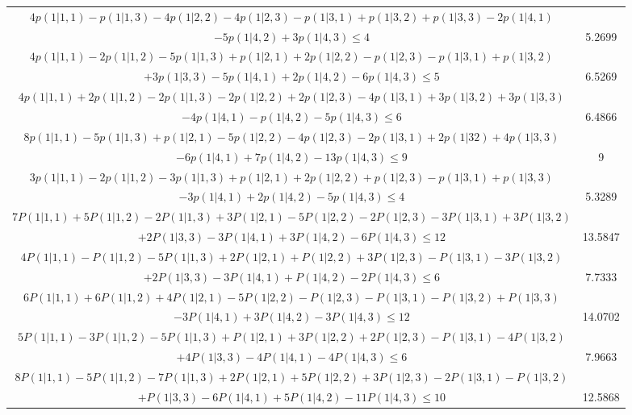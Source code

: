 \documentclass[11pt]{article}
\begin{document}
\begin{table}[htbp]
{\begin{tabular}{|c|c|}
      $4p(1|1,1) -p(1|1,3) -4p(1|2,2) -4p(1|2,3) -p(1|3,1) +p(1|3,2) +p(1|3,3) -2p(1|4,1) $&\\$ -5p(1|4,2) +3p(1|4,3) \leqslant 4$ & 5.2699\\ \hline

      $4p(1|1,1) -2p(1|1,2) -5p(1|1,3) +p(1|2,1) +2p(1|2,2) -p(1|2,3) -p(1|3,1) +p(1|3,2) $&\\$+3p(1|3,3) -5p(1|4,1) +2p(1|4,2) -6p(1|4,3) \leqslant 5$ &  6.5269 \\ \hline

      $4p(1|1,1) +2p(1|1,2) -2p(1|1,3) -2p(1|2,2) +2p(1|2,3) -4p(1|3,1) +3p(1|3,2) +3p(1|3,3) $&\\$ -4p(1|4,1) -p(1|4,2) -5p(1|4,3) \leqslant 6$ &  6.4866\\ \hline

      $8p(1|1,1) -5p(1|1,3) +p(1|2,1) -5p(1|2,2) -4p(1|2,3) -2p(1|3,1) +2p(1|32) +4p(1|3,3) $&\\$ -6p(1|4,1) +7p(1|4,2) -13p(1|4,3) \leqslant 9$ & 9 \\ \hline

      $3p(1|1,1) -2p(1|1,2) -3p(1|1,3) +p(1|2,1) +2p(1|2,2) +p(1|2,3) -p(1|3,1) +p(1|3,3) $&\\$-3p(1|4,1) +2p(1|4,2) -5p(1|4,3) \leqslant 4$ & 5.3289\\ \hline

      $7P(1|1,1) +5P(1|1,2) -2P(1|1,3) +3P(1|2,1) -5P(1|2,2) -2P(1|2,3) -3P(1|3,1) +3P(1|3,2) $&\\$+2P(1|3,3) -3P(1|4,1) +3P(1|4,2) -6P(1|4,3) \leqslant 12$ & 13.5847\\ \hline

      $4P(1|1,1) -P(1|1,2) -5P(1|1,3) +2P(1|2,1) +P(1|2,2) +3P(1|2,3) -P(1|3,1) -3P(1|3,2) $&\\$+2P(1|3,3) -3P(1|4,1) +P(1|4,2) -2P(1|4,3) \leqslant 6$ & 7.7333\\ \hline

      $6P(1|1,1) +6P(1|1,2) +4P(1|2,1) -5P(1|2,2) -P(1|2,3) -P(1|3,1) -P(1|3,2) +P(1|3,3) $&\\$ -3P(1|4,1) +3P(1|4,2) -3P(1|4,3) \leqslant 12$ & 14.0702 \\ \hline

      $5P(1|1,1) -3P(1|1,2) -5P(1|1,3) +P(1|2,1) +3P(1|2,2) +2P(1|2,3) -P(1|3,1) -4P(1|3,2) $&\\$ +4P(1|3,3) -4P(1|4,1) -4P(1|4,3) \leqslant 6$ & 7.9663\\ \hline

      $8P(1|1,1) -5P(1|1,2) -7P(1|1,3) +2P(1|2,1) +5P(1|2,2) +3P(1|2,3) -2P(1|3,1) -P(1|3,2) $&\\$ +P(1|3,3) -6P(1|4,1) +5P(1|4,2) -11P(1|4,3) \leqslant 10$ &  12.5868\\ \hline


\end{tabular}}
\end{table}
\end{document}
